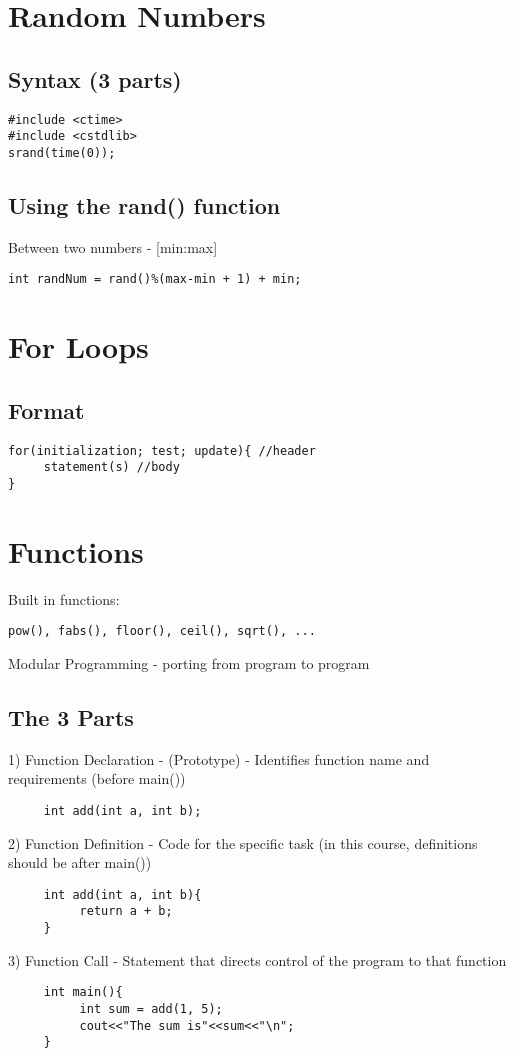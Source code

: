 \documentclass{article}
\begin{document}
\section{Random Numbers}

\subsection{Syntax (3 parts)}

\begin{verbatim}
#include <ctime>
#include <cstdlib>
srand(time(0));
\end{verbatim}

\subsection{Using the rand() function}
Between two numbers - [min:max]

\begin{verbatim}
int randNum = rand()%(max-min + 1) + min;
\end{verbatim}

\section{For Loops}

\subsection{Format}
\begin{verbatim}
for(initialization; test; update){ //header
     statement(s) //body
}
\end{verbatim}

\section{Functions}

Built in functions:
\begin{verbatim}
pow(), fabs(), floor(), ceil(), sqrt(), ...
\end{verbatim}

\noindent
Modular Programming - porting from program to program\\

\subsection{The 3 Parts}
1) Function Declaration - (Prototype) - Identifies function name and requirements (before main())
\begin{verbatim}
     int add(int a, int b);
\end{verbatim}
2) Function Definition - Code for the specific task (in this course, definitions should be after main())
\begin{verbatim}
     int add(int a, int b){
          return a + b;
     }
\end{verbatim}
3) Function Call - Statement that directs control of the program to that function
\begin{verbatim}
     int main(){
          int sum = add(1, 5);
    	  cout<<"The sum is"<<sum<<"\n";
     }
\end{verbatim}
\end{document}
